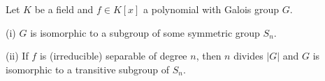 Let $K$ be a field and $f \in K[x]$ a polynomial with Galois group $G$.

(i) $G$ is isomorphic to a subgroup of some symmetric group $S_n$.

(ii) If $f$ is (irreducible) separable of degree $n$, then $n$ divides $|G|$ and $G$ is isomorphic to a transitive subgroup of $S_n$.
